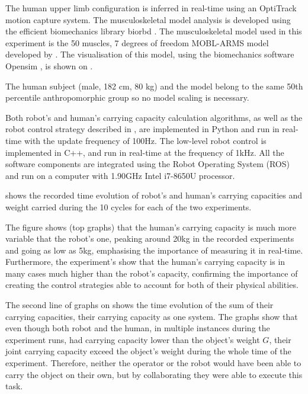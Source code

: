 The human upper limb configuration is inferred in real-time using an OptiTrack~\cite{optitrack} motion capture system. The musculoskeletal model analysis is developed using the efficient biomechanics library {biorbd} \cite{Michaud2021}. The musculoskeletal model used in this experiment is the 50 muscles, 7 degrees of freedom MOBL-ARMS model \cite{saul2015benchmarking}  developed by \citet{holzbaur2005model}. The visualisation of this model, using the biomechanics software Opensim \cite{opensim}, is shown on .

The human subject (male, 182 cm, 80 kg) and the model belong to the same 50th percentile anthropomorphic group \cite{gordon1989anthropometric} so no model scaling \cite{correa20112782} is necessary.


Both robot's and human's carrying capacity calculation algorithms, as well as the robot control strategy described in , are implemented in Python and run in real-time with the update frequency of 100Hz. The low-level robot control is implemented in C++, and run in real-time at the frequency of 1kHz. All the software components are integrated using the Robot Operating System (ROS) and run on a computer with 1.90GHz Intel i7-8650U processor. 

 shows the recorded time evolution of robot's and human's carrying capacities and weight carried during the 10 cycles for each of the two experiments.

The figure shows (top graphs) that the human's carrying capacity is much more variable that the robot's one, peaking around 20kg in the recorded experiments and going as low as 5kg, emphasising the importance of measuring it in real-time. Furthermore, the experiment's show that the human's carrying capacity is in many cases much higher than the robot's capacity, confirming the importance of creating the control strategies able to account for both of their physical abilities. 

The second line of graphs on  shows the time evolution of the sum of their carrying capacities, their carrying capacity as one system. The graphs show that even though both robot and the human, in multiple instances during the experiment runs, had carrying capacity lower than the object's weight $G$, their joint carrying capacity exceed the object's weight during the whole time of the experiment. Therefore, neither the operator or the robot would have been able to carry the object on their own, but by collaborating they were able to execute this task.

